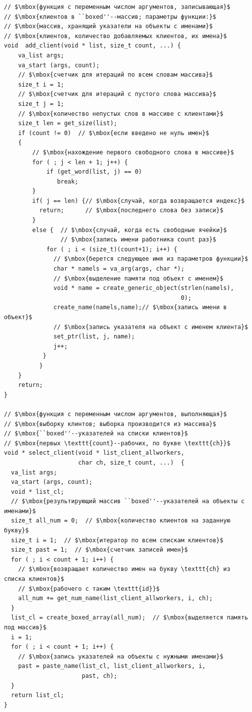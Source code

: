 \begin{lstlisting}[mathescape]
// $\mbox{функция с переменным числом аргументов, записывающая}$
// $\mbox{клиентов в ``boxed''--массив; параметры функции:}$
// $\mbox{массив, хранящий указатели на объекты с именами}$
// $\mbox{клиентов, количество добавляемых клиентов, их имена}$
void  add_client(void * list, size_t count, ...) {
    va_list args;
    va_start (args, count);
    // $\mbox{счетчик для итераций по всем словам массива}$
    size_t i = 1;
    // $\mbox{счетчик для итераций с пустого слова массива}$
    size_t j = 1;
    // $\mbox{количество непустых слов в массиве с клиентами}$
    size_t len = get_size(list);
    if (count != 0)  // $\mbox{если введено не нуль имен}$
    {
        // $\mbox{нахождение первого свободного слова в массиве}$
        for ( ; j < len + 1; j++) { 
            if (get_word(list, j) == 0)
               break;
        }
        if( j == len) {// $\mbox{случай, когда возвращается индекс}$
          return;      // $\mbox{последнего слова без записи}$
        }
        else {  // $\mbox{случай, когда есть свободные ячейки}$
                // $\mbox{запись имени работника count раз}$
            for ( ; i < (size_t)(count+1); i++) {
              // $\mbox{берется следующее имя из параметров функции}$
              char * namels = va_arg(args, char *);
              // $\mbox{выделение памяти под объект с именем}$
              void * name = create_generic_object(strlen(namels), 
                                                  0);  
              create_name(namels,name);// $\mbox{запись имени в объект}$
              // $\mbox{запись указателя на объект с именем клиента}$
              set_ptr(list, j, name);
              j++;
           }
          }
    }
    return;
}

// $\mbox{функция с переменным числом аргументов, выполняющая}$
// $\mbox{выборку клинтов; выборка производится из массива}$
// $\mbox{``boxed''--указателей на списки клиентов}$
// $\mbox{первых \texttt{count}--рабочих, по букве \texttt{ch}}$
void * select_client(void * list_client_allworkers,
                     char ch, size_t count, ...)  {  
  va_list args;
  va_start (args, count);
  void * list_cl;  
  // $\mbox{результирующий массив ``boxed''--указателей на объекты с именами}$
  size_t all_num = 0;  // $\mbox{количество клиентов на заданную букву}$
  size_t i = 1;  // $\mbox{итератор по всем спискам клиентов}$
  size_t past = 1;  // $\mbox{счетчик записей имен}$
  for ( ; i < count + 1; i++) {
    // $\mbox{возвращает количество имен на букву \texttt{ch} из списка клиентов}$
    // $\mbox{рабочего с таким \texttt{id}}$
    all_num += get_num_name(list_client_allworkers, i, ch);   
  }
  list_cl = create_boxed_array(all_num);  // $\mbox{выделяется память под массив}$
  i = 1;
  for ( ; i < count + 1; i++) {
    // $\mbox{запись указателей на объекты с нужными именами}$
    past = paste_name(list_cl, list_client_allworkers, i, 
                      past, ch);
  }
  return list_cl;
}


\end{lstlisting}
